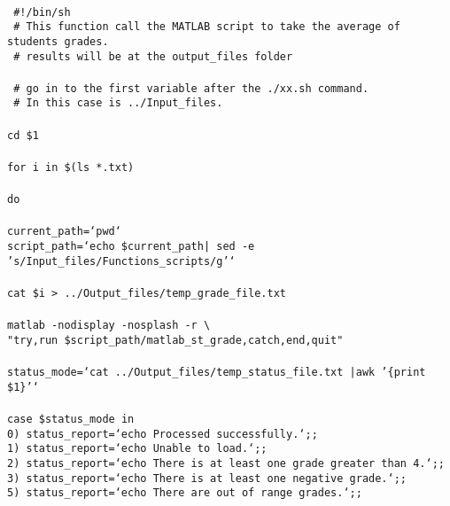 \begin{mdframed}[hidealllines=true,backgroundcolor=gray!20]
\begin{singlespace}
\fontsize{10pt}{1pt}
\texttt{
\\
{ \color{matlab_green} \#!/bin/sh}\\
{ \color{matlab_green} \# This function call the MATLAB script to take the average of students grades.}\\
{ \color{matlab_green} \# results will be at the output\_files folder}\\
\\
{ \color{matlab_green} \# go in to the first variable after the ./xx.sh command.}\\
{ \color{matlab_green} \# In this case is ../Input\_files.}\\
\\
cd \$1\\
\\
{\color{for_pink}for} i {\color{for_pink}in} \$(ls *.txt)\\
\\
{\color{for_pink}do}\\
\\
current\_path={\color{red}`pwd`}\\
script\_path={\color{red}`echo \$current\_path| sed -e 's/Input\_files/Functions\_scripts/g'`}\\
\\
cat \$i > ../Output\_files/temp\_grade\_file.txt\\
\\
matlab -nodisplay -nosplash -r   \textbackslash \\
{\color{red}"try,run \$script\_path/matlab\_st\_grade,catch,end,quit"}\\
\\
status\_mode={\color{red}`cat ../Output\_files/temp\_status\_file.txt |awk '\{print \$1\}'`}\\
\\
{\color{for_pink}case} \$status\_mode {\color{for_pink}in}\\
0) status\_report={\color{red}`echo Processed successfully.`};;\\
1) status\_report={\color{red}`echo Unable to load.`};;\\
2) status\_report={\color{red}`echo There is at least one grade greater than 4.`};;\\
3) status\_report={\color{red}`echo There is at least one negative grade.`};;\\
5) status\_report={\color{red}`echo There are out of range grades.`};;\\
}
\end{singlespace}
\end{mdframed}
